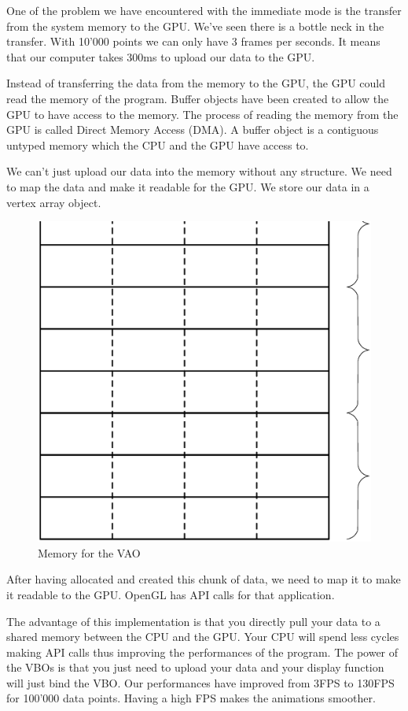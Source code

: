 One of the problem we have encountered with the immediate mode is the transfer from the system memory to the GPU.  We've seen there is a bottle neck in the transfer. With 10'000 points we can only have 3 frames per seconds. It means that our computer takes 300ms to upload our data to the GPU.

Instead of transferring the data from the memory to the GPU, the GPU could read the memory of the program. Buffer objects have been created to allow the GPU to have access to the memory. The process of reading the memory from the GPU is called Direct Memory Access (DMA). A buffer object is a contiguous untyped memory which the CPU and the GPU have access to.

We can't just upload our data into the memory without any structure. We need to map the data and make it readable for the GPU. We store our data in a vertex array object.

\begin{figure}[H]
  \centering
  \includegraphics[scale=0.2]{images/memory.eps}
    \caption{Memory for the VAO}
  \label{memoryVAO}
\end{figure}


After having allocated and created this chunk of data, we need to map it to make it readable to the GPU. OpenGL has API calls for that application.

The advantage of this implementation is that you directly pull your data to a shared memory between the CPU and the GPU. Your CPU will spend less cycles making API calls thus improving the performances of the program. The power of the VBOs is that you just need to upload your data and your display function will just bind the VBO. Our performances have improved from 3FPS to 130FPS for 100'000 data points. Having a high FPS makes the animations smoother.

